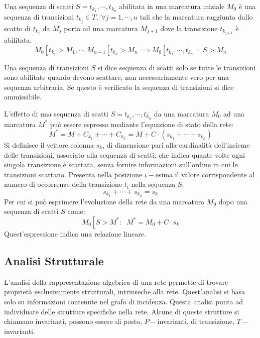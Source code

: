 \documentclass{article}
\numberwithin{equation}{subsection}
\begin{document}
Una sequenza di scatti $S=t_{k_1},\cdots,t_{k_n}$ abilitata in una marcatura iniziale $M_0$ è una sequenza di transizioni $t_{k_j}\in T,\;\forall j=1,\cdots,n$ tali che la 
marcatura raggiunta dallo scatto di $t_{k_j}$ da $M_j$ porta ad una marcatura $M_{j+1}$ dove la transizione $t_{k_{j+1}}$ è abilitata:
\begin{equation*}
    M_0\left[\right.t_{k_1}>M_1,\cdots,M_{n-1}\left[\right.t_{k_n}>M_n\implies M_0\left[\right.t_{k_1},\cdots,t_{k_n}=S>M_n
\end{equation*}

Una sequenza di transizioni $S$ si dice sequenza di scatti solo se tutte le transizioni sono abilitate quando devono scattare, non necessariamente vero per una sequenza 
arbitraria. Se questo è verificato la sequenza di transizioni si dice ammissibile. 

L'effetto di una sequenza di scatti $S=t_{k_1},\cdots,t_{k_n}$ da una marcatura $M_0$ ad una marcatura $M^*$ può essere espresso mediante l'equazione di stato della rete:
\begin{equation*}
    M^*=M+C_{k_1}+\cdots+C_{k_n}=M+C\cdot(s_{k_1}+\cdots+s_{k_n})
\end{equation*}
Si definisce il vettore colonna $s_k$, di dimensione pari alla cardinalità dell'insieme delle transizioni, associato alla sequenza di scatti, che indica quante volte ogni 
singola transizione è scattata, senza fornire informazioni sull'ordine in cui le transizioni scattano. Presenta nella posizione $i-$esima il valore corrispondente al numero 
di occorrenze della transizione $t_i$ nella sequenza $S$:
\begin{equation*}
    s_{k_1}+\cdots+s_{k_n}=s_k
\end{equation*}
Per cui si può esprimere l'evoluzione della rete da una marcatura $M_0$ dopo una sequenza di scatti $S$ come:
\begin{equation}
    M_0\left[\right.S>M^*:\;\;M^*=M_0+C\cdot s_k
\end{equation}
Quest'espressione indica una relazione lineare. 

\subsection{Analisi Strutturale}

L'analisi della rappresentazione algebrica di una rete permette di trovare proprietà esclusivamente strutturali, intrinseche alla rete. Quest'analisi si basa solo su 
informazioni contenute nel grafo di incidenza. Questa analisi punta ad individuare delle strutture specifiche nella rete. Alcune di queste strutture si chiamano invarianti, 
possono essere di posto, $P-$invarianti, di transizione, $T-$invarianti. 
\end{document}
